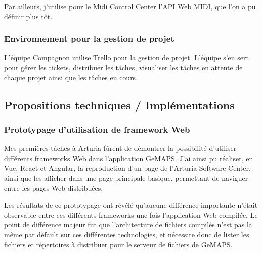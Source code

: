 \documentclass[francais]{rapportPFE}  %
\begin{document}
Par ailleurs, j'utilise pour le Midi Control Center l'API Web MIDI, que l'on a pu définir plus tôt. 

\subsubsection{Environnement pour la gestion de projet}
L'équipe Compagnon utilise Trello pour la gestion de projet. L'équipe s'en sert pour gérer les tickets, distribuer les tâches, visualiser les tâches en attente de chaque projet ainsi que les tâches en cours.

\subsection{Propositions techniques / Implémentations}
\subsubsection{Prototypage d'utilisation de framework Web}
Mes premières tâches à Arturia fûrent de démontrer la possibilité d'utiliser différents frameworks Web dans l'application GeMAPS.
J'ai ainsi pu réaliser, en Vue, React et Angular, la reproduction d'un page de l'Arturia Software Center, ainsi que les afficher dans une page principale basique, permettant de naviguer entre les pages Web distribuées. 

Les résultats de ce prototypage ont révélé qu'aucune différence importante n'était observable entre ces différents frameworks une fois l'application Web compilée. Le point de différence majeur fut que l'architecture de fichiers compilés n'est pas la même par défault sur ces différentes technologies, et nécessite donc de lister les fichiers et répertoires à distribuer pour le serveur de fichiers de GeMAPS.
\end{document}
